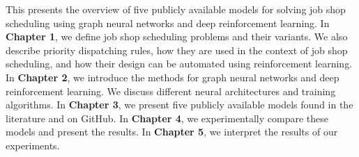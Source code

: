 \par
This presents the overview of five publicly available models for solving job shop scheduling using graph neural networks and deep reinforcement learning. In \textbf{Chapter 1}, we define job shop scheduling problems and their variants. We also describe priority dispatching rules, how they are used in the context of job shop scheduling, and how their design can be automated using reinforcement learning. In \textbf{Chapter 2}, we introduce the methods for graph neural networks and deep reinforcement learning. We discuss different neural architectures and training algorithms. In \textbf{Chapter 3}, we present five publicly available models found in the literature and on GitHub. In \textbf{Chapter 4}, we experimentally compare these models and present the results. In \textbf{Chapter 5}, we interpret the results of our experiments.